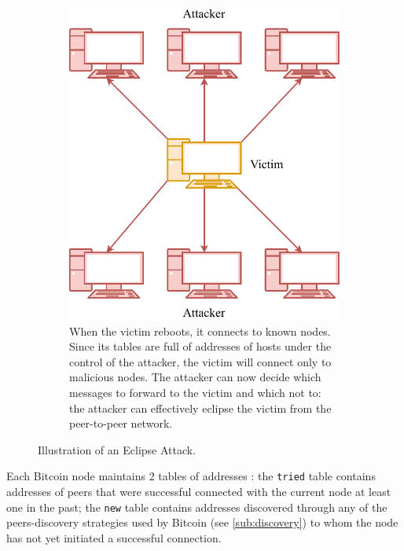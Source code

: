 \begin{figure}[h!]
\begin{subfigure}{.45\textwidth}
{		}
	\end{subfigure}
	\hfill
	\begin{subfigure}{.45\textwidth}
		\vspace*{0.25cm}
		\includegraphics[width=\columnwidth]{figures/eclipse_2}
		\vspace*{0.1cm}
		\caption{
			When the victim reboots, it connects to known nodes.
			Since its tables are full of addresses of hosts under the control of the attacker, the victim will connect only to malicious nodes.
			The attacker can now decide which messages to forward to the victim and which not to:
			the attacker can effectively eclipse the victim from the peer-to-peer network.
		}
	\end{subfigure}
	\caption[Illustration of an Eclipse Attack]{Illustration of an Eclipse Attack.}
	\label{fig:eclipse}
\end{figure}

\medskip
Each Bitcoin node maintains \num{2} tables of addresses \cite{eclipse_attack_2015}:
the \texttt{tried} table contains addresses of peers that were successful connected with the current node at least one in the past;
the \texttt{new} table contains addresses discovered through any of the peers-discovery strategies used by Bitcoin (see \cref{sub:discovery}) to whom the node has not yet initiated a successful connection.

